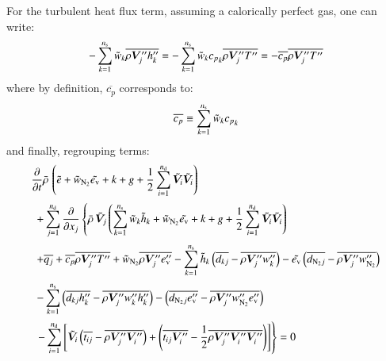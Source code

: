 \documentclass{warpdoc}
\newcommand{\alb}{\vspace{0.2cm}\\} %
\newcommand{\Cp}{{c_{p}}}
\newcommand{\nd}{{{n}_{\rm d}}}
\newcommand{\ns}{{{n}_{\rm s}}}
\newcommand{\mfd}{\displaystyle}
\newcommand{\ev}{e_{\rm v}}
\newcommand{\cNtwo}{w_{\rm N_2}}
\begin{document}
%
For the turbulent heat flux term, assuming a calorically perfect gas, one can write:
%
\begin{equation}
  -\sum_{k=1}^\ns {\wtilde{w}_k} \overline{\rho \bm{V}_j^{\prime\prime} h_k^{\prime\prime}}
    = 
  -\sum_{k=1}^\ns {\wtilde{w}_k} \Cp_k \overline{\rho \bm{V}_j^{\prime\prime} T^{\prime\prime}}
    = 
  -\overline{\Cp} \overline{\rho \bm{V}_j^{\prime\prime} T^{\prime\prime}}
\end{equation}
%
where by definition, $\overline{\Cp}$ corresponds to:
%
\begin{equation}
  \overline{\Cp} \equiv \sum_{k=1}^\ns {\wtilde{w}_k} \Cp_k
  \label{eqn:Cp}
\end{equation}
%
and finally, regrouping terms:
%
\begin{equation}
 \begin{array}{l}
    \mfd\frac{\partial}{\partial t}  \wbar{\rho}\,
       \left(  \wtilde{e}
           + 
          {\wtilde{w}_{\rm N_2}}\wtilde{\ev}
           + 
          k
           + 
          g
           + \frac{1}{2}\sum_{i=1}^{\nd}  {\wtilde{\bm{V}}_i}  {\wtilde{\bm{V}}_i}
       \right)\alb\mfd~~
     + \sum_{j=1}^{\nd} \frac{\partial}{\partial x_j} \left\{ \wbar{\rho}\, {\wtilde{\bm{V}}_j}
       \left(
            \sum_{k=1}^{\ns} {\wtilde{w}_k}  {\wtilde{h}_k}
          + {\wtilde{w}_{\rm N_2}}\wtilde{\ev}  + k + g
          + \frac{1}{2}\sum_{i=1}^{\nd} {\wtilde{\bm{V}}_i}  {\wtilde{\bm{V}}_i}
       \right) \right.\alb~~
    \mfd+ \overline{q_j}+\overline{\Cp}  \overline{\rho  \bm{V}_j^{\prime\prime}  T^{\prime\prime}} +{\wtilde{w}_{\rm N_2}} \overline{\rho \bm{V}_j^{\prime\prime} \ev^{\prime\prime}}
      -\sum_{k=1}^{\ns}{\wtilde{h}_k} \left( \overline{ d_{kj} }

      -\overline{\rho  \bm{V}_j^{\prime\prime}  w_k^{\prime\prime}}\right)
      -\wtilde{\ev} \left(\overline{d_{{\rm N_2}j} }       - \overline{\rho \bm{V}_j^{\prime\prime} \cNtwo^{\prime\prime}}\right)\alb
    \mfd~~
        - \sum_{k=1}^{\ns}\left( \overline{ d_{kj}  h_k^{\prime\prime} } - \overline{\rho  \bm{V}_j^{\prime\prime}  w_k^{\prime\prime}  h_k^{\prime\prime} } \right)
   -\left(\overline{d_{{\rm N_2}j}\ev^{\prime\prime} }    -\overline{\rho \bm{V}_j^{\prime\prime} \cNtwo^{\prime\prime} \ev^{\prime\prime}} \right)
        \alb
 ~~   \mfd \left.  - \sum_{i=1}^{\nd}
       \left[
          {\wtilde{\bm{V}}_i} \left( \overline{ t_{ij} } -\overline{\rho  \bm{V}_j^{\prime\prime}  \bm{V}_i^{\prime\prime}}\right)
        + \left( \overline{ t_{ij}  \bm{V}_i^{\prime\prime} } -\frac{1}{2}\overline{\rho  \bm{V}_j^{\prime\prime}  \bm{V}_i^{\prime\prime}  \bm{V}_i^{\prime\prime} } \right)
       \right]
    \right\}= 0
 \end{array}
 \label{eqn:etstar:final}
\end{equation}
%
\end{document}
